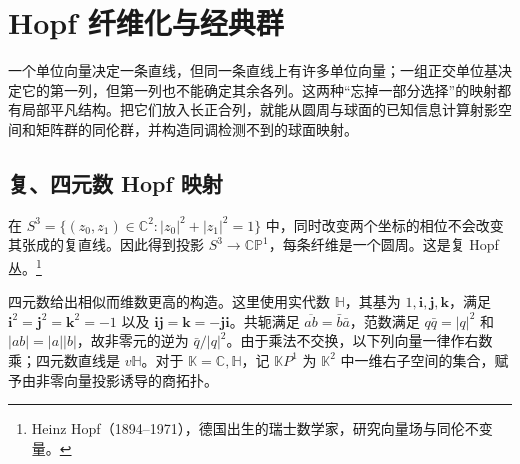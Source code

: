 
% 
% 
% 

\section{Hopf 纤维化与经典群}
\label{g2:sec:0804}

一个单位向量决定一条直线，但同一条直线上有许多单位向量；一组正交单位基决定它的第一列，但第一列也不能确定其余各列。这两种“忘掉一部分选择”的映射都有局部平凡结构。把它们放入长正合列，就能从圆周与球面的已知信息计算射影空间和矩阵群的同伦群，并构造同调检测不到的球面映射。

\subsection{复、四元数 Hopf 映射}
\label{g2:subsec:0804:01}

在 \(S^3=\{(z_0,z_1)\in\mathbb C^2:|z_0|^2+|z_1|^2=1\}\) 中，同时改变两个坐标的相位不会改变其张成的复直线。因此得到投影 \(S^3\rightarrow\mathbb{CP}^1\)，每条纤维是一个圆周。这是复 Hopf 丛。\footnote{Heinz Hopf（1894--1971），德国出生的瑞士数学家，研究向量场与同伦不变量。}

\ProseParagraphBreak

四元数给出相似而维数更高的构造。这里使用实代数 \(\mathbb H\)，其基为 \(1,\mathbf i,\mathbf j,\mathbf k\)，满足 \(\mathbf i^2=\mathbf j^2=\mathbf k^2=-1\) 以及 \(\mathbf i\mathbf j=\mathbf k=-\mathbf j\mathbf i\)。共轭满足 \(\overline{ab}=\bar b\bar a\)，范数满足 \(q\bar q=|q|^2\) 和 \(|ab|=|a||b|\)，故非零元的逆为 \(\bar q/|q|^2\)。由于乘法不交换，以下列向量一律作右数乘；四元数直线是 \(v\mathbb H\)。对于 \(\mathbb K=\mathbb C,\mathbb H\)，记 \(\mathbb KP^1\) 为 \(\mathbb K^2\) 中一维右子空间的集合，赋予由非零向量投影诱导的商拓扑。

